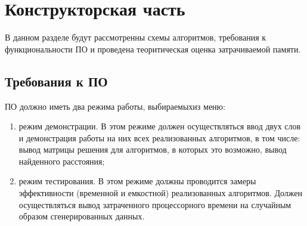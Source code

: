\documentclass{article}
\begin{document}
	\section{Конструкторская часть}
		В данном разделе будут рассмотренны схемы алгоритмов, требования к функциональности ПО и проведена теоритическая оценка затрачиваемой памяти.
		\subsection{Требования к ПО} 
		ПО должно иметь два режима работы, выбираемыхиз меню:
		\begin{enumerate}
			\item режим демонстрации. В этом режиме должен осуществляться ввод двух слов и демонстрация работы на них всех реализованных алгоритмов, в том числе: вывод матрицы решения для алгоритмов, в которых это возможно, вывод найденного расстояния;
		 	\item режим тестирования. В этом режиме должны проводится замеры эффективности (временной и емкостной) реализованных алгоритмов. Должен осуществляться вывод затраченного процессорного времени на случайным образом сгенерированных данных.
	 	\end{enumerate}
\end{document}
